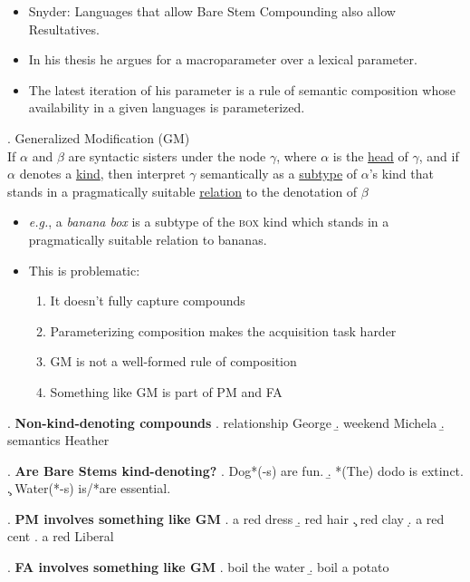 \documentclass[letterpaper]{article}
\begin{document}
\begin{itemize}
  \item Snyder: Languages that allow Bare Stem Compounding also allow Resultatives.
  \item In his thesis he argues for a macroparameter over a lexical parameter.
  \item The latest iteration of his parameter is a rule of semantic composition whose availability in a given languages is parameterized.
\end{itemize}
\ex. Generalized Modification (GM)\\
If $\alpha$ and $\beta$ are syntactic sisters under the node $\gamma$, where $\alpha$ is the \uline{head} of $\gamma$, and if $\alpha$ denotes a \uline{kind}, then interpret $\gamma$ semantically as a \uline{subtype} of $\alpha$'s kind that stands in a pragmatically suitable \uline{relation} to the denotation of $\beta$
\parencite[][underlining Snyder's]{snyder2012parameter}

\begin{itemize}
  \item \textit{e.g.}, a \textit{banana box} is a subtype of the \textsc{box} kind which stands in a pragmatically suitable relation to bananas.
  \item This is problematic:
    \begin{enumerate}
      \item It doesn't fully capture compounds
      \item Parameterizing composition makes the acquisition task harder
      \item GM is not a well-formed rule of composition
      \item Something like GM is part of PM and FA
    \end{enumerate}
\end{itemize}
\ex. \textbf{Non-kind-denoting compounds}
\a. relationship George
\b. weekend Michela
\b. semantics Heather

\ex. \textbf{Are Bare Stems kind-denoting?}
\a. Dog*(-s) are fun.
\b. *(The) dodo is extinct.
\c. Water(*-s) is/*are essential.

\ex. \textbf{PM involves something like GM}
\a. a red dress
\b. red hair
\c. red clay
\d. a red cent
\e. a red Liberal

\ex. \textbf{FA involves something like GM}
\a. boil the water
\b. boil a potato
\end{document}
